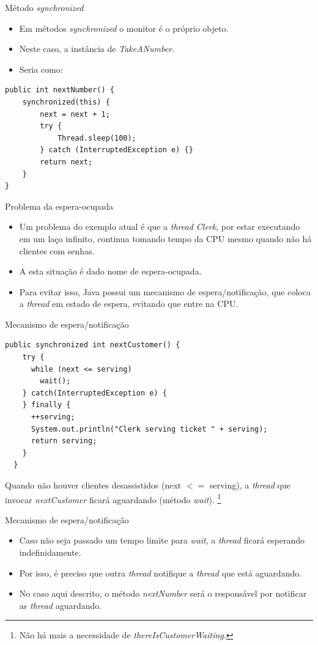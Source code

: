 \documentclass[11pt,justified]{beamer}
\newcommand\blfootnote[1]{%
  \begingroup
  \renewcommand\thefootnote{}\footnote{#1}%
  \addtocounter{footnote}{-1}%
  \endgroup
}
\begin{document}
\begin{frame}[fragile]{Método \textit{synchronized}}
    \begin{itemize}
        \item Em métodos \textit{synchronized} o monitor é o próprio objeto.
        \item Neste caso, a instância de \textit{TakeANumber}.
        \item Seria como:
    \end{itemize}
    \begin{lstlisting}
public int nextNumber() {
    synchronized(this) {
        next = next + 1;
        try {
            Thread.sleep(100);
        } catch (InterruptedException e) {}
        return next;
    }
}
    \end{lstlisting}
\end{frame}

\begin{frame}{Problema da espera-ocupada}
    \begin{itemize}
        \item Um problema do exemplo atual é que a \textit{thread Clerk}, por estar executando em um laço infinito, continua tomando tempo da CPU mesmo quando não há clientes com senhas.
        \item A esta situação é dado nome de espera-ocupada.
        \item Para evitar isso, Java possui um mecanismo de espera/notificação, que coloca a \textit{thread} em estado de espera, evitando que entre na CPU.
    \end{itemize}
\end{frame}

\begin{frame}[fragile]{Mecanismo de espera/notificação}
    \begin{lstlisting}
public synchronized int nextCustomer() {
    try {
      while (next <= serving)
        wait();
    } catch(InterruptedException e) {
    } finally {
      ++serving;
      System.out.println("Clerk serving ticket " + serving);
      return serving;
    }
  }
\end{lstlisting}
    Quando não houver clientes desassistidos (next $<=$ serving), a \textit{thread} que invocar \textit{nextCustomer} ficará aguardando (método \textit{wait}).\blfootnote{Não há mais a necessidade de \textit{thereIsCustomerWaiting}.}
\end{frame}

\begin{frame}{Mecanismo de espera/notificação}
    \begin{itemize}
        \item Caso não seja passado um tempo limite para \textit{wait}, a \textit{thread} ficará esperando indefinidamente.
        \item Por isso, é preciso que outra \textit{thread} notifique a \textit{thread} que está aguardando.
        \item No caso aqui descrito, o método \textit{nextNumber} será o responsável por notificar as \textit{thread} aguardando.
    \end{itemize}
\end{frame}
\end{document}
